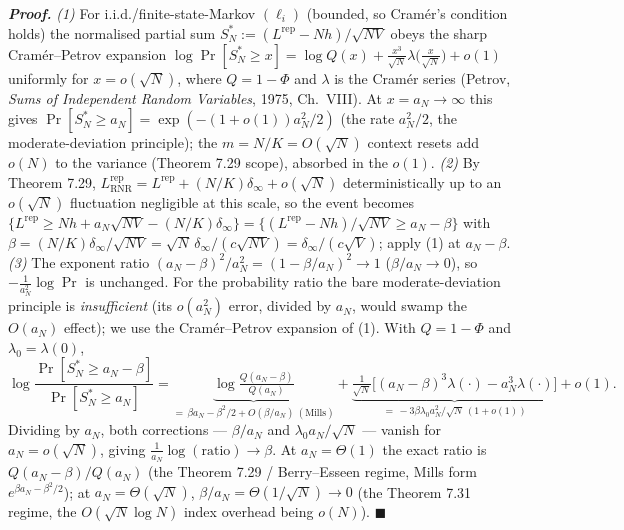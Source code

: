 \documentclass[
]{article}
\begin{document}
\emph{\textbf{Proof.}} \emph{(1)} For i.i.d./finite-state-Markov $(\ell_i)$ (bounded,
so Cram\'er's condition holds) the normalised partial sum
$S^\ast_N:=(L^{\mathrm{rep}}-Nh)/\sqrt{NV}$ obeys the sharp Cram\'er--Petrov expansion
$\log\Pr[S^\ast_N\ge x]=\log Q(x)+\tfrac{x^3}{\sqrt N}\lambda\!\bigl(\tfrac{x}{\sqrt
N}\bigr)+o(1)$ uniformly for $x=o(\sqrt N)$, where $Q=1-\Phi$ and $\lambda$ is the
Cram\'er series (Petrov, \emph{Sums of Independent Random Variables}, 1975,
Ch.~VIII). At $x=a_N\to\infty$ this gives $\Pr[S^\ast_N\ge a_N]=\exp(-(1+o(1))a_N^2/2)$
(the rate $a_N^2/2$, the moderate-deviation principle); the $m=N/K=O(\sqrt N)$ context
resets add $o(N)$ to the variance (Theorem 7.29 scope), absorbed in the $o(1)$.
\emph{(2)} By Theorem 7.29,
$L^{\mathrm{rep}}_{\mathrm{RNR}}=L^{\mathrm{rep}}+(N/K)\delta_\infty+o(\sqrt N)$
deterministically up to an $o(\sqrt N)$ fluctuation negligible at this scale, so the
event becomes $\{L^{\mathrm{rep}}\ge Nh+a_N\sqrt{NV}-(N/K)\delta_\infty\}=
\{(L^{\mathrm{rep}}-Nh)/\sqrt{NV}\ge a_N-\beta\}$ with $\beta=(N/K)\delta_\infty/
\sqrt{NV}=\sqrt N\,\delta_\infty/(c\sqrt{NV})=\delta_\infty/(c\sqrt V)$; apply (1) at
$a_N-\beta$. \emph{(3)} The exponent ratio $(a_N-\beta)^2/a_N^2=(1-\beta/a_N)^2\to1$
($\beta/a_N\to0$), so $-\tfrac1{a_N^2}\log\Pr$ is unchanged. For the probability ratio
the bare moderate-deviation principle is \emph{insufficient} (its $o(a_N^2)$ error,
divided by $a_N$, would swamp the $O(a_N)$ effect); we use the Cram\'er--Petrov
expansion of (1). With $Q=1-\Phi$ and $\lambda_0=\lambda(0)$,
\[
  \log\frac{\Pr[S^\ast_N\ge a_N-\beta]}{\Pr[S^\ast_N\ge a_N]}
  =\underbrace{\log\tfrac{Q(a_N-\beta)}{Q(a_N)}}_{=\,\beta a_N-\beta^2/2+O(\beta/a_N)\ (\text{Mills})}
  +\underbrace{\tfrac{1}{\sqrt N}\bigl[(a_N-\beta)^3\lambda(\cdot)-a_N^3\lambda(\cdot)\bigr]}
  _{=\,-3\beta\lambda_0 a_N^2/\sqrt N\,(1+o(1))}+o(1).
\]
Dividing by $a_N$, both corrections --- $\beta/a_N$ and $\lambda_0 a_N/\sqrt N$ ---
vanish for $a_N=o(\sqrt N)$, giving $\tfrac1{a_N}\log(\text{ratio})\to\beta$. At
$a_N=\Theta(1)$ the exact ratio is $Q(a_N-\beta)/Q(a_N)$ (the Theorem 7.29 /
Berry--Esseen regime, Mills form $e^{\beta a_N-\beta^2/2}$); at $a_N=\Theta(\sqrt N)$,
$\beta/a_N=\Theta(1/\sqrt N)\to0$ (the Theorem 7.31 regime, the $O(\sqrt N\log N)$
index overhead being $o(N)$).
\hfill$\blacksquare$
\end{document}
